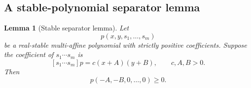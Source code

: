 \documentclass[11pt]{article}
\newtheorem{lemma}[theorem]{Lemma}
\theoremstyle{definition}
\theoremstyle{remark}
\newcommand{\1}{\mathbf 1}
\begin{document}
\subsection{A stable-polynomial separator lemma}

\begin{lemma}[Stable separator lemma]\label{lem:stable-separator}
Let
\begin{equation}
 p(x,y,s_1,\dots,s_m)
\end{equation}
be a real-stable multi-affine polynomial with strictly positive coefficients.  Suppose
the coefficient of $s_1\cdots s_m$ is
\begin{equation}\label{eq:top-s-coeff}
 [s_1\cdots s_m]p=c(x+A)(y+B),\qquad c,A,B>0.
\end{equation}
Then
\begin{equation}\label{eq:separator-algebraic-conclusion}
 p(-A,-B,0,\dots,0)\ge0.
\end{equation}
\end{lemma}
\end{document}
